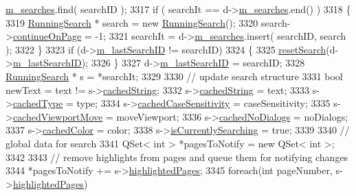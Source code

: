 \begin{DoxyCode}
{      \hyperlink{classOkular_1_1DocumentPrivate_a42420dd45075092b921a829b8e9f2214}{m\_searches}.find( searchID );
3317     \textcolor{keywordflow}{if} ( searchIt == d->\hyperlink{classOkular_1_1DocumentPrivate_a42420dd45075092b921a829b8e9f2214}{m\_searches}.end() )
3318     \{
3319         \hyperlink{structRunningSearch}{RunningSearch} * search = \textcolor{keyword}{new} \hyperlink{structRunningSearch}{RunningSearch}();
3320         search->\hyperlink{structRunningSearch_a69213b1663cb154fee0cca4b877c4c05}{continueOnPage} = -1;
3321         searchIt = d->\hyperlink{classOkular_1_1DocumentPrivate_a42420dd45075092b921a829b8e9f2214}{m\_searches}.insert( searchID, search );
3322     \}
3323     \textcolor{keywordflow}{if} (d->\hyperlink{classOkular_1_1DocumentPrivate_a83278116cf6b0e38d834c8e416e17de6}{m\_lastSearchID} != searchID)
3324     \{
3325         \hyperlink{classOkular_1_1Document_a9a6bfbdfcf7a07fcf3b2624fdea81126}{resetSearch}(d->\hyperlink{classOkular_1_1DocumentPrivate_a83278116cf6b0e38d834c8e416e17de6}{m\_lastSearchID});
3326     \}
3327     d->\hyperlink{classOkular_1_1DocumentPrivate_a83278116cf6b0e38d834c8e416e17de6}{m\_lastSearchID} = searchID;
3328     \hyperlink{structRunningSearch}{RunningSearch} * s = *searchIt;
3329 
3330     \textcolor{comment}{// update search structure}
3331     \textcolor{keywordtype}{bool} newText = text != s->\hyperlink{structRunningSearch_aeed5bd658d162c7650b2e4cb315df054}{cachedString};
3332     s->\hyperlink{structRunningSearch_aeed5bd658d162c7650b2e4cb315df054}{cachedString} = text;
3333     s->\hyperlink{structRunningSearch_a1b4026cf76ef3dce1f2b8b831670d784}{cachedType} = type;
3334     s->\hyperlink{structRunningSearch_a18e388eb59284584e8bd1f514ef7eaf5}{cachedCaseSensitivity} = caseSensitivity;
3335     s->\hyperlink{structRunningSearch_a82fb2c89035371061b259d4f1b62ff35}{cachedViewportMove} = moveViewport;
3336     s->\hyperlink{structRunningSearch_a407eed15ba7e4e73db19b37bda4cf4c1}{cachedNoDialogs} = noDialogs;
3337     s->\hyperlink{structRunningSearch_ab49ca5b36bab91976e99620b0701fffe}{cachedColor} = color;
3338     s->\hyperlink{structRunningSearch_a2683a901cf457f541ca4662294e02cec}{isCurrentlySearching} = \textcolor{keyword}{true};
3339 
3340     \textcolor{comment}{// global data for search}
3341     QSet< int > *pagesToNotify = \textcolor{keyword}{new} QSet< int >;
3342 
3343     \textcolor{comment}{// remove highlights from pages and queue them for notifying changes}
3344     *pagesToNotify += s->\hyperlink{structRunningSearch_a5827c4228354199d0a4447dca7f19fb1}{highlightedPages};
3345     \textcolor{keywordflow}{foreach}(\textcolor{keywordtype}{int} pageNumber, s->\hyperlink{structRunningSearch_a5827c4228354199d0a4447dca7f19fb1}{highlightedPages})
}
\end{DoxyCode}
